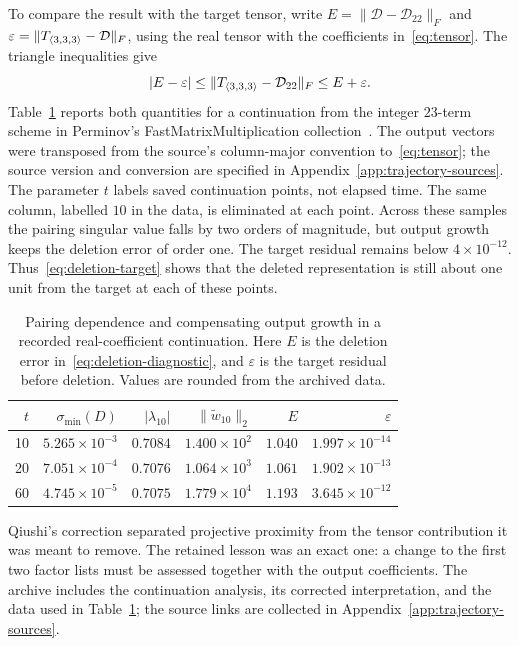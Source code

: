 To compare the result with the target tensor, write
$E=\|\mathcal D-\mathcal D_{22}\|_F$ and
$\varepsilon=\|T_{\langle3,3,3\rangle}-\mathcal D\|_F$, using the real tensor with the
coefficients in~\eqref{eq:tensor}. The triangle inequalities give
\begin{equation}\label{eq:deletion-target}
 |E-\varepsilon|\leq\|T_{\langle3,3,3\rangle}-\mathcal D_{22}\|_F
                  \leq E+\varepsilon.
\end{equation}
Table~\ref{tab:continuation} reports both quantities for a continuation
from the integer $23$-term scheme  in
Perminov's FastMatrixMultiplication collection~\cite{perminov-code}.
The output vectors were transposed from the source's column-major
convention to~\eqref{eq:tensor}; the source version and conversion
are specified in Appendix~\ref{app:trajectory-sources}.
The parameter $t$ labels saved continuation points, not elapsed time.
The same column, labelled $10$ in the data, is eliminated at each
point. Across these samples the pairing singular value falls by two
orders of magnitude, but output growth keeps the deletion error of
order one. The target residual remains below $4\times10^{-12}$.
Thus~\eqref{eq:deletion-target} shows that the deleted representation
is still about one unit from the target at each of these points.

\begin{table}[htbp]
\centering
\caption{Pairing dependence and compensating output growth in a
recorded real-coefficient continuation. Here $E$ is the deletion error
in~\eqref{eq:deletion-diagnostic}, and $\varepsilon$ is the target
residual before deletion. Values are rounded from the archived data.}
\label{tab:continuation}
\small
\begin{tabular}{rrrrrr}
\toprule
$t$ & $\sigma_{\min}(D)$ & $|\lambda_{10}|$ & $\|\widetilde w_{10}\|_2$ & $E$ & $\varepsilon$\\
\midrule
10 & $5.265\times10^{-3}$ & $0.7084$ & $1.400\times10^2$ & $1.040$ & $1.997\times10^{-14}$\\
20 & $7.051\times10^{-4}$ & $0.7076$ & $1.064\times10^3$ & $1.061$ & $1.902\times10^{-13}$\\
60 & $4.745\times10^{-5}$ & $0.7075$ & $1.779\times10^4$ & $1.193$ & $3.645\times10^{-12}$\\
\bottomrule
\end{tabular}
\end{table}

Qiushi's correction separated projective proximity from the tensor
contribution it was meant to remove. The retained lesson was an exact
one: a change to the first two factor lists must be assessed together
with the output coefficients. The archive includes the continuation
analysis, its corrected interpretation, and the data used in
Table~\ref{tab:continuation}; the source links are collected in
Appendix~\ref{app:trajectory-sources}.

